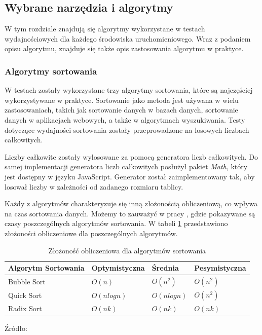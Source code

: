 \subsection{Wybrane narzędzia i algorytmy}
W tym rozdziale znajdują się algorytmy wykorzystane w testach wydajnościowych dla każdego środowiska uruchomieniowego. Wraz z podaniem opisu algorytmu, znajduje się także opis zastosowania algorytmu w praktyce.

\subsubsection{Algorytmy sortowania}
W testach zostały wykorzystane trzy algorytmy sortowania, które są najczęściej wykorzystywane w praktyce. Sortowanie jako metoda jest używana w wielu zastosowaniach, takich jak sortowanie danych w bazach danych, sortowanie danych w aplikacjach webowych, a także w algorytmach wyszukiwania. Testy dotyczące wydajności sortowania zostały przeprowadzone na losowych liczbach całkowitych.

Liczby całkowite zostały wylosowane za pomocą generatora liczb całkowitych. Do samej implementacji generatora liczb całkowitych posłużył pakiet \textit{Math}, który jest dostępny w języku JavaScript. Generator został zaimplementowany tak, aby losował liczby w zależności od zadanego rozmiaru tablicy.

Każdy z algorytmów charakteryzuje się inną złożonością obliczeniową, co wpływa na czas sortowania danych. Możemy to zauważyć w pracy \cite{sorting}, gdzie pokazywane są czasy poszczególnych algorytmów sortowania. W tabeli \ref{tab:sorting_complexity} przedstawiono złożoności obliczeniowe dla poszczególnych algorytmów.

\begin{table}[H]
  \centering
  \caption{Złożoność obliczeniowa dla algorytmów sortowania \\}
  \begin{tabular}{|l|l|l|l|}
  \hline
  \textbf{Algorytm Sortowania} & \textbf{Optymistyczna} & \textbf{Średnia} & \textbf{Pesymistyczna} \\ \hline
    Bubble Sort & $O(n)$ & $O(n^2)$ & $O(n^2)$ \\ 
    \hline
    Quick Sort & $O(n log n)$ & $O(n log n)$ & $O(n^2)$ \\ 
    \hline
    Radix Sort & $O(nk)$ & $O(nk)$ & $O(nk)$ \\
    \hline
  \end{tabular}
  \par\vspace{0.3cm} 
  \parbox{0.9\linewidth}{
    \centering Źródło: \cite{sorting}
  }
  \label{tab:sorting_complexity}
\end{table}

